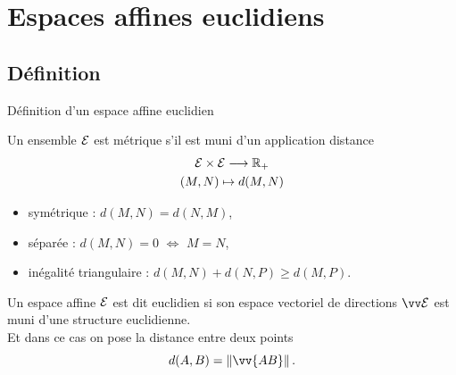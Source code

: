 \documentclass[bigger]{m53beamer}
\begin{document}
\section{Espaces affines euclidiens}

\subsection{Définition}
\begin{frame}{Définition d'un espace affine euclidien}
  \begin{definition}
    Un ensemble $\mathcal{E}$ est \alert{métrique} s'il est muni d'un application \alert{distance}\forsimple{\vspace*{-.7\baselineskip}}
    \begin{gather*}
      \mathcal{E} \times \mathcal{E} \longrightarrow \mathbb{R}_{+}\\
      (M,N) \mapsto d(M,N)
    \end{gather*}\vspace*{-.7\baselineskip}
    \begin{itemize}[<+(1)->]
      \item symétrique : $d(M,N) = d(N,M)$,
      \item séparée : $d(M,N) = 0$ $\Leftrightarrow$ $M=N$,
      \item inégalité triangulaire : $d(M,N)+d(N,P)\geq d(M,P)$.
    \end{itemize}
  \end{definition}\pause
  \begin{definition}
    Un espace affine $\mathcal{E}$ est dit \alert{euclidien} si son espace vectoriel de directions $\ev{E}$ est muni d'une structure euclidienne.\pause\\
    Et dans ce cas on pose la distance entre deux points
    \[
      d(A,B) = \norm{\vv{AB}}.
    \]
  \end{definition}
\end{frame}

\end{document}
